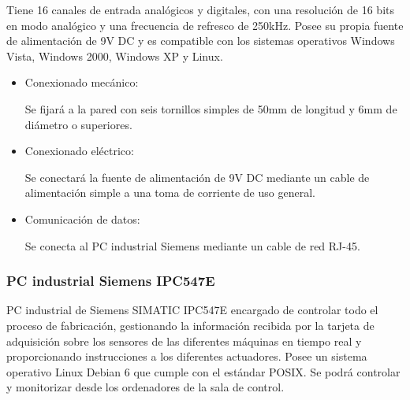		Tiene 16 canales de entrada analógicos y digitales, con una resolución de 16 bits en modo analógico y una frecuencia de refresco de 250kHz. Posee su propia fuente de alimentación de 9V DC y es compatible con los sistemas operativos Windows Vista, Windows 2000, Windows XP y Linux.\\

		\begin{itemize}
				\item{Conexionado mecánico:}
				
				Se fijará a la pared con seis tornillos simples de 50mm de longitud y 6mm de diámetro o superiores.

				\item{Conexionado eléctrico:}

				Se conectará la fuente de alimentación de 9V DC mediante un cable de alimentación simple a una toma de corriente de uso general.
				 				
				\item{Comunicación de datos:}
				
				Se conecta al PC industrial Siemens mediante un cable de red RJ-45.

		\end{itemize}

\newpage

	\subsubsection{PC industrial Siemens IPC547E}


	PC industrial de Siemens SIMATIC IPC547E encargado de controlar todo el proceso de fabricación, gestionando la información recibida por la tarjeta de adquisición sobre los sensores de las diferentes máquinas en tiempo real y proporcionando instrucciones a los diferentes actuadores. Posee un sistema operativo Linux Debian 6 que cumple con el estándar POSIX. Se podrá controlar y monitorizar desde los ordenadores de la sala de control.\\

